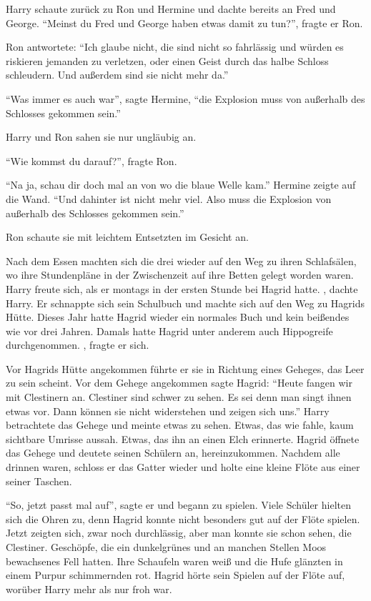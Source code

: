 Harry schaute zurück zu Ron und Hermine und dachte bereits an Fred und George. \enquote{Meinst du Fred und George haben etwas damit zu tun?}, fragte er Ron.

Ron antwortete: \enquote{Ich glaube nicht, die sind nicht so fahrlässig und würden es riskieren jemanden zu verletzen, oder einen Geist durch das halbe Schloss schleudern. Und außerdem sind sie nicht mehr da.}

\enquote{Was immer es auch war}, sagte Hermine, \enquote{die Explosion muss von außerhalb des Schlosses gekommen sein.}

Harry und Ron sahen sie nur ungläubig an.

\enquote{Wie kommst du darauf?}, fragte Ron.

\enquote{Na ja, schau dir doch mal an von wo die blaue Welle kam.} Hermine zeigte auf die Wand. \enquote{Und dahinter ist nicht mehr viel. Also muss die Explosion von außerhalb des Schlosses gekommen sein.}

Ron schaute sie mit leichtem Entsetzten im Gesicht an.

Nach dem Essen machten sich die drei wieder auf den Weg zu ihren Schlafsälen, wo ihre Stundenpläne in der Zwischenzeit auf ihre Betten gelegt worden waren. Harry freute sich, als er montags in der ersten Stunde  bei Hagrid hatte. , dachte Harry. Er schnappte sich sein Schulbuch und machte sich auf den Weg zu Hagrids Hütte. Dieses Jahr hatte Hagrid wieder ein normales Buch und kein beißendes wie vor drei Jahren. Damals hatte Hagrid unter anderem auch Hippogreife durchgenommen. , fragte er sich.

Vor Hagrids Hütte angekommen führte er sie in Richtung eines Geheges, das Leer zu sein scheint. Vor dem Gehege angekommen sagte Hagrid: \enquote{Heute fangen wir mit Clestinern an. Clestiner sind schwer zu sehen. Es sei denn man singt ihnen etwas vor. Dann können sie nicht widerstehen und zeigen sich uns.} Harry betrachtete das Gehege und meinte etwas zu sehen. Etwas, das wie fahle, kaum sichtbare Umrisse aussah. Etwas, das ihn an einen Elch erinnerte. Hagrid öffnete das Gehege und deutete seinen Schülern an, hereinzukommen. Nachdem alle drinnen waren, schloss er das Gatter wieder und holte eine kleine Flöte aus einer seiner Taschen.

\enquote{So, jetzt passt mal auf}, sagte er und begann zu spielen. Viele Schüler hielten sich die Ohren zu, denn Hagrid konnte nicht besonders gut auf der Flöte spielen. Jetzt zeigten sich, zwar noch durchlässig, aber man konnte sie schon sehen, die Clestiner. Geschöpfe, die ein dunkelgrünes und an manchen Stellen Moos bewachsenes Fell hatten. Ihre Schaufeln waren weiß und die Hufe glänzten in einem Purpur schimmernden rot. Hagrid hörte sein Spielen auf der Flöte auf, worüber Harry mehr als nur froh war.


